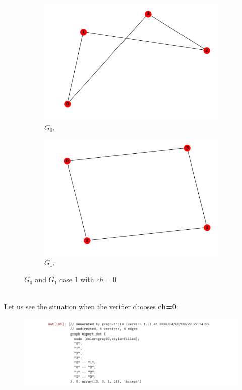 \documentclass[12pt,a4paper]{article}
\begin{document}
\begin{itemize}
\begin{figure}[h!]
\begin{subfigure}[b]{.4\linewidth}
		\includegraphics[width=\linewidth]{3-3.png}
		\caption{$G_0$.}
	\end{subfigure}
	\begin{subfigure}[b]{.4\linewidth}
		\includegraphics[width=\linewidth]{3-4.png}
		\caption{$G_1$.}
	\end{subfigure}
	\caption{$G_0$ and $G_1$ case 1 with $ch=0$}
	\label{fig:case 1,$G_0$ and $G_1$ with $ch=0$}
\end{figure}\\
Let us see the situation when the verifier chooses \textbf{ch=0}:\\
 \begin{figure}[h]
 	\centering
 	\includegraphics[width=1.25\linewidth]{3-5}

\end{figure}
\end{itemize}
\end{document}
